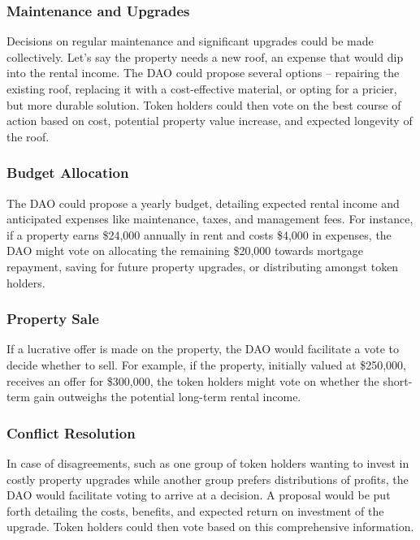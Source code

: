 \documentclass[11pt]{article}
\begin{document}
\subsubsection{Maintenance and Upgrades}

Decisions on regular maintenance and significant upgrades could be made collectively. Let's say the property needs a new roof, an expense that would dip into the rental income. The DAO could propose several options -- repairing the existing roof, replacing it with a cost-effective material, or opting for a pricier, but more durable solution. Token holders could then vote on the best course of action based on cost, potential property value increase, and expected longevity of the roof.


\subsubsection{Budget Allocation}

The DAO could propose a yearly budget, detailing expected rental income and anticipated expenses like maintenance, taxes, and management fees. For instance, if a property earns \$24,000 annually in rent and costs \$4,000 in expenses, the DAO might vote on allocating the remaining \$20,000 towards mortgage repayment, saving for future property upgrades, or distributing amongst token holders.


\subsubsection{Property Sale}

If a lucrative offer is made on the property, the DAO would facilitate a vote to decide whether to sell. For example, if the property, initially valued at \$250,000, receives an offer for \$300,000, the token holders might vote on whether the short-term gain outweighs the potential long-term rental income.


\subsubsection{Conflict Resolution}

In case of disagreements, such as one group of token holders wanting to invest in costly property upgrades while another group prefers distributions of profits, the DAO would facilitate voting to arrive at a decision. A proposal would be put forth detailing the costs, benefits, and expected return on investment of the upgrade. Token holders could then vote based on this comprehensive information.
\end{document}

